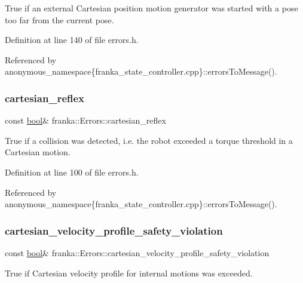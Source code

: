 True if an external Cartesian position motion generator was started with a pose too far from the current pose. 

Definition at line 140 of file errors.\+h.



Referenced by anonymous\+\_\+namespace\{franka\+\_\+state\+\_\+controller.\+cpp\}\+::errors\+To\+Message().

\mbox{\label{structfranka_1_1Errors_a47bd58b0ab2198e4d038e0a24eafb310}} 
\subsubsection{\texorpdfstring{cartesian\+\_\+reflex}{cartesian\_reflex}}
{\footnotesize\ttfamily const \hyperlink{classbool}{bool}\& franka\+::\+Errors\+::cartesian\+\_\+reflex}

True if a collision was detected, i.\+e. the robot exceeded a torque threshold in a Cartesian motion. 

Definition at line 100 of file errors.\+h.



Referenced by anonymous\+\_\+namespace\{franka\+\_\+state\+\_\+controller.\+cpp\}\+::errors\+To\+Message().

\mbox{\label{structfranka_1_1Errors_afc093fc5f99e1f6cab6de4fa9bc32692}} 
\subsubsection{\texorpdfstring{cartesian\+\_\+velocity\+\_\+profile\+\_\+safety\+\_\+violation}{cartesian\_velocity\_profile\_safety\_violation}}
{\footnotesize\ttfamily const \hyperlink{classbool}{bool}\& franka\+::\+Errors\+::cartesian\+\_\+velocity\+\_\+profile\+\_\+safety\+\_\+violation}

True if Cartesian velocity profile for internal motions was exceeded. 

